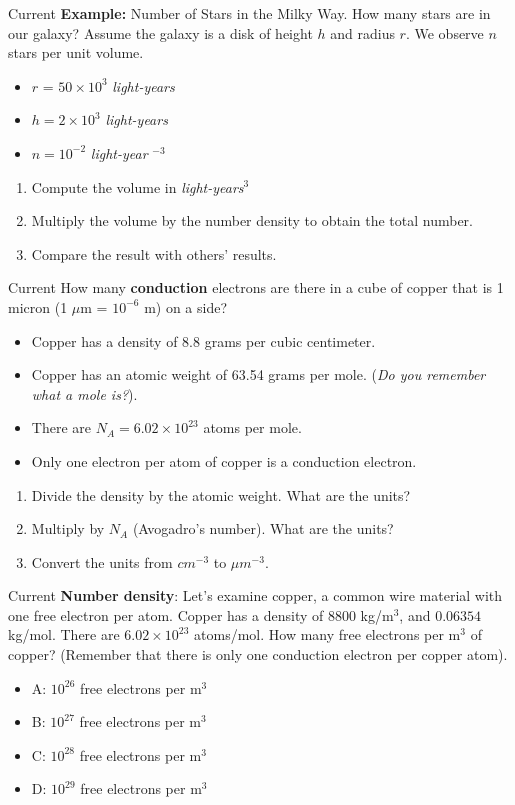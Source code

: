 \documentclass{beamer}
\begin{document}
\begin{frame}{Current}
\textbf{Example:} \alert{Number of Stars in the Milky Way}.  How many stars are in our galaxy?  Assume the galaxy is a disk of height $h$ and radius $r$.  We observe $n$ stars per unit volume.
\begin{itemize}
\item $r$ = $50 \times 10^3$ \textit{light-years}
\item $h = 2 \times 10^3$ \textit{light-years}
\item $n = 10^{-2}$ \textit{light-year} $^{-3}$
\end{itemize}
\begin{enumerate}
\item Compute the volume in \textit{light-years}$^3$
\item Multiply the volume by the number density to obtain the total number.
\item Compare the result with others' results.
\end{enumerate}
\end{frame}

\begin{frame}{Current}
\small
How many \textbf{conduction} electrons are there in a cube of copper that is 1 micron (1 $\mu$m = $10^{-6}$ m) on a side?
\begin{itemize}
\item Copper has a density of 8.8 grams per cubic centimeter.
\item Copper has an atomic weight of 63.54 grams per mole.  (\textit{Do you remember what a mole is?}).
\item There are $N_A = 6.02 \times 10^{23}$ atoms per mole.
\item Only one electron per atom of copper is a conduction electron.
\end{itemize} \hrulefill
\begin{enumerate}
\item Divide the density by the atomic weight.  What are the units?
\item Multiply by $N_A$ (Avogadro's number).  What are the units?
\item Convert the units from $cm^{-3}$ to $\mu m^{-3}$.
\end{enumerate}
\end{frame}

\begin{frame}{Current}
\textbf{Number density}: Let's examine copper, a common wire material with one free electron per atom.  Copper has a density of 8800 kg/m$^3$, and $0.06354$ kg/mol.  There are $6.02 \times 10^{23}$ atoms/mol.  How many free electrons per m$^3$ of copper? (Remember that there is only one conduction electron per copper atom).
\begin{itemize}
\item A: $10^{26}$ free electrons per m$^3$
\item B: $10^{27}$ free electrons per m$^3$
\item C: $10^{28}$ free electrons per m$^3$
\item D: $10^{29}$ free electrons per m$^3$
\end{itemize}
\end{frame}
\end{document}
